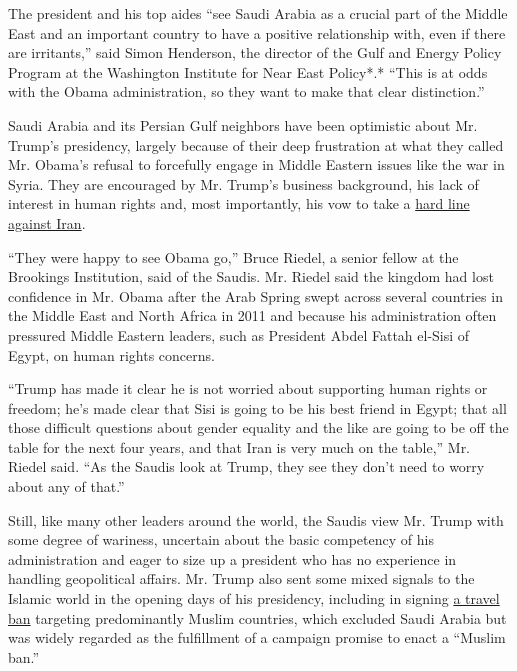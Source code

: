 The president and his top aides ``see Saudi Arabia as a crucial part of
the Middle East and an important country to have a positive relationship
with, even if there are irritants,'' said Simon Henderson, the director
of the Gulf and Energy Policy Program at the Washington Institute for
Near East Policy*.* ``This is at odds with the Obama administration, so
they want to make that clear distinction.''

Saudi Arabia and its Persian Gulf neighbors have been optimistic about
Mr. Trump's presidency, largely because of their deep frustration at
what they called Mr. Obama's refusal to forcefully engage in Middle
Eastern issues like the war in Syria. They are encouraged by Mr. Trump's
business background, his lack of interest in human rights and, most
importantly, his vow to take a
\href{https://www.nytimes3xbfgragh.onion/2017/02/07/world/middleeast/trump-iran-ayatollah-ali-khamenei.html}{hard
line against Iran}.

``They were happy to see Obama go,'' Bruce Riedel, a senior fellow at
the Brookings Institution, said of the Saudis. Mr. Riedel said the
kingdom had lost confidence in Mr. Obama after the Arab Spring swept
across several countries in the Middle East and North Africa in 2011 and
because his administration often pressured Middle Eastern leaders, such
as President Abdel Fattah el-Sisi of Egypt, on human rights concerns.

``Trump has made it clear he is not worried about supporting human
rights or freedom; he's made clear that Sisi is going to be his best
friend in Egypt; that all those difficult questions about gender
equality and the like are going to be off the table for the next four
years, and that Iran is very much on the table,'' Mr. Riedel said. ``As
the Saudis look at Trump, they see they don't need to worry about any of
that.''

Still, like many other leaders around the world, the Saudis view Mr.
Trump with some degree of wariness, uncertain about the basic competency
of his administration and eager to size up a president who has no
experience in handling geopolitical affairs. Mr. Trump also sent some
mixed signals to the Islamic world in the opening days of his
presidency, including in signing
\href{https://www.nytimes3xbfgragh.onion/2017/01/27/us/politics/trump-syrian-refugees.html}{a
travel ban} targeting predominantly Muslim countries, which excluded
Saudi Arabia but was widely regarded as the fulfillment of a campaign
promise to enact a ``Muslim ban.''

